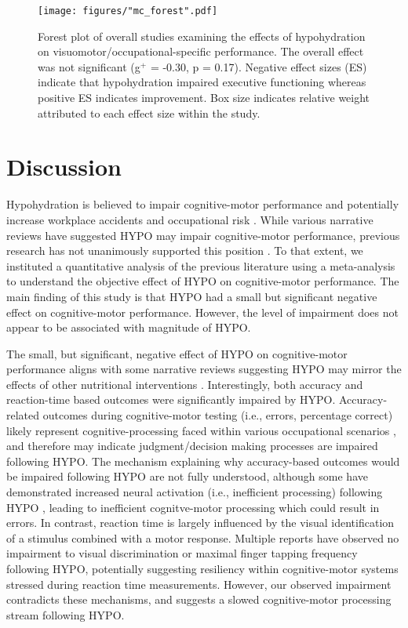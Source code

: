 \begin{figure}
	\centering
	\texttt{[image: figures/"mc\_forest".pdf]}
	\caption{Forest plot of overall studies examining the effects of hypohydration on visuomotor/occupational-specific performance. The overall effect was not significant (g${^+}$ = -0.30, p = 0.17). Negative effect sizes (ES) indicate that hypohydration impaired executive functioning whereas positive ES indicates improvement. Box size indicates relative weight attributed to each effect size within the study.}
	\label{fig:mc_forest}
\end{figure}

\section{Discussion}
Hypohydration is believed to impair cognitive-motor performance and potentially increase workplace accidents and occupational risk \cite{kenefick_hydration_2007}. While various narrative reviews have suggested HYPO may impair cognitive-motor performance, previous research has not unanimously supported this position \cite{cheuvront_dehydration:_2014}. To that extent, we instituted a quantitative analysis of the previous literature using a meta-analysis to understand the objective effect of HYPO on cognitive-motor performance. The main finding of this study is that HYPO had a small but significant negative effect on cognitive-motor performance. However, the level of impairment does not appear to be associated with magnitude of HYPO.

The small, but significant, negative effect of HYPO on cognitive-motor performance aligns with some narrative reviews suggesting HYPO may mirror the effects of other nutritional interventions \cite{masento_effects_2014}. Interestingly, both accuracy and reaction-time based outcomes were significantly impaired by HYPO. Accuracy-related outcomes during cognitive-motor testing (i.e., errors, percentage correct) likely represent cognitive-processing faced within various occupational scenarios \cite{wickens_multiple_2002}, and therefore may indicate judgment/decision making processes are impaired following HYPO. The mechanism explaining why accuracy-based outcomes would be impaired following HYPO are not fully understood, although some have demonstrated increased neural activation (i.e., inefficient processing) following HYPO \cite{kempton_dehydration_2011}, leading to inefficient cognitve-motor processing which could result in errors. In contrast, reaction time is largely influenced by the visual identification of a stimulus combined with a motor response. Multiple reports have observed no impairment to visual discrimination \cite{grego_influence_2005, van_den_heuvel_independent_2017} or maximal finger tapping frequency \cite{bandelow_effects_2010} following HYPO, potentially suggesting resiliency within cognitive-motor systems stressed during reaction time measurements. However, our observed impairment contradicts these mechanisms, and suggests a slowed cognitive-motor processing stream following HYPO.

